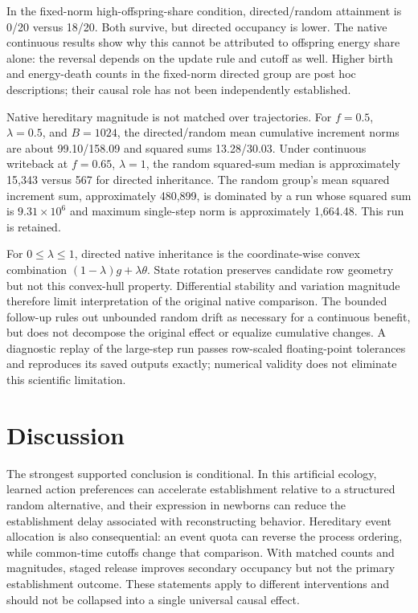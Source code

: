 \documentclass[11pt]{article}
\begin{document}
In the fixed-norm high-offspring-share condition, directed/random attainment is 0/20 versus 18/20. Both survive, but directed occupancy is lower. The native continuous results show why this cannot be attributed to offspring energy share alone: the reversal depends on the update rule and cutoff as well. Higher birth and energy-death counts in the fixed-norm directed group are post hoc descriptions; their causal role has not been independently established.

Native hereditary magnitude is not matched over trajectories. For $f=0.5$, $\lambda=0.5$, and $B=1024$, the directed/random mean cumulative increment norms are about 99.10/158.09 and squared sums 13.28/30.03. Under continuous writeback at $f=0.65$, $\lambda=1$, the random squared-sum median is approximately 15,343 versus 567 for directed inheritance. The random group's mean squared increment sum, approximately 480,899, is dominated by a run whose squared sum is $9.31\times10^6$ and maximum single-step norm is approximately 1,664.48. This run is retained.

For $0\leq\lambda\leq1$, directed native inheritance is the coordinate-wise convex combination $(1-\lambda)g+\lambda\theta$. State rotation preserves candidate row geometry but not this convex-hull property. Differential stability and variation magnitude therefore limit interpretation of the original native comparison. The bounded follow-up rules out unbounded random drift as necessary for a continuous benefit, but does not decompose the original effect or equalize cumulative changes. A diagnostic replay of the large-step run passes row-scaled floating-point tolerances and reproduces its saved outputs exactly; numerical validity does not eliminate this scientific limitation.

\section{Discussion}
The strongest supported conclusion is conditional. In this artificial ecology, learned action preferences can accelerate establishment relative to a structured random alternative, and their expression in newborns can reduce the establishment delay associated with reconstructing behavior. Hereditary event allocation is also consequential: an event quota can reverse the process ordering, while common-time cutoffs change that comparison. With matched counts and magnitudes, staged release improves secondary occupancy but not the primary establishment outcome. These statements apply to different interventions and should not be collapsed into a single universal causal effect.
\end{document}
